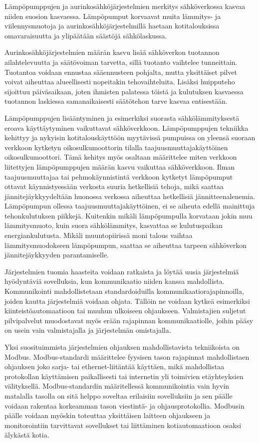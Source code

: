 Lämpöpumppujen ja aurinkosähköjärjestelmien merkitys sähköverkossa kasvaa niiden suosion kasvaessa. Lämpöpumput korvaavat muita lämmitys- ja viilennysmuotoja ja aurinkosähköjärjestelmillä haetaan kotitalouksissa omavaraisuutta ja ylipäätään säästöjä sähkölaskussa.

Aurinkosähköjärjestelmien määrän kasvu lisää sähköverkon tuotannon ailahtelevuutta ja säätövoiman tarvetta, sillä tuotanto vaihtelee tunneittain. Tuotantoa voidaan ennustaa sääennusteen pohjalta, mutta yksittäiset pilvet voivat aiheuttaa alueellisesti nopeitakin tehovaihteluita. Lisäksi huipputeho sijoittuu päiväsaikaan, joten ihmisten palatessa töistä ja kulutuksen kasvaessa tuotannon laskiessa samanaikaisesti säätötehon tarve kasvaa entisestään.

Lämpöpumppujen lisääntyminen ja esimerkiksi suorasta sähkölämmityksestä eroava käyttäytyminen vaikuttavat sähköverkkoon. Lämpöpumppujen tekniikka kehittyy ja nykyisin kotitalouskäyttöön myytävissä pumpuissa on yleensä suoraan verkkoon kytketyn oikosulkumoottorin tilalla taajuusmuuttajakäyttöinen oikosulkumoottori. Tämä kehitys myös osaltaan määrittelee miten verkkoon liitettyjen lämpöpumppujen määrän kasvu vaikuttaa sähköverkkoon. Ilman taajuusmuuttajaa tai pehmokäynnistintä verkkoon kytketyt lämpöpumput ottavat käynnistyessään verkosta suuria hetkellisiä tehoja, mikä saattaa jännitejäykkyydeltään huonossa verkossa aiheuttaa hetkellisiä jännitteenalenemia. Lämpöpumpun ollessa taajuusmuuttajakäyttöinen, ei se aiheuta edellä mainittuja tehonkulutuksen piikkejä. Kuitenkin mikäli lämpöpumpulla korvataan jokin muu lämmitysmuoto, kuin suora sähkölämmitys, kasvattaa se kulutuspaikan energiankulutusta. Mikäli muuntopiirissä moni talous vaihtaa lämmitysmuodokseen lämpöpumpun, saattaa se aiheuttaa tarpeen sähköverkon jännitejäykkyyden parantamiselle.

Järjestelmien tuomia haasteita voidaan ratkaista ja löytää uusia järjestelmiä hyödyntäviä sovelluksia, kun kommunikaatio niiden kanssa mahdollista. Kommunikointi mahdollistetaan standardoiduilla kommunikaatiorajapinnoilla, joiden kautta järjestelmiä voidaan ohjata. Tällöin ne voidaan kytkeä esimerkiksi kiinteistöautomaatioon tai muuhun ulkoiseen ohjaukseen. Valmistajien suljetut pilvipalvelut muodostavat myös erään rajapinnan kommunikaatiolle, joihin pääsy on usein vain valmistajalla ja järjestelmän omistajalla.

Yksi suosituimmista järjestelmien ohjauksen mahdollistavista tekniikoista on Modbus. Modbus-standardi määrittelee fyysisen tason rajapinnat mahdollistaen ohjauksen joko sarja- tai ethernet-liitäntää käyttäen, mikä mahdollistaa protokollan käyttämisen paikallisesti tai internetin yli toimivien etäyhteyksien välityksellä. Modbus-standardin määritellessä kommunikointia vain hyvin matalalla tasolla on sitä helppo soveltaa erilaisiin sovelluksiin ja sen päälle voidaan rakentaa korkeamman tason viestintä- ja ohjausprotokollia. Modbusin päälle voidaan myöskin toteuttaa yksittäisen laitteen ohjaukseen ja monitorointiin tarvittavat sovellukset tai liittäminen kotiautomaatioon osaksi älykästä kotia.

